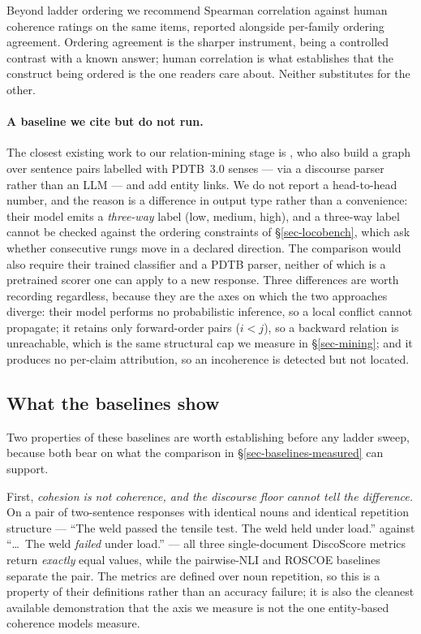 Beyond ladder ordering we recommend Spearman correlation against human coherence ratings on the same
items, reported alongside per-family ordering agreement. Ordering agreement is the sharper instrument,
being a controlled contrast with a known answer; human correlation is what establishes that the
construct being ordered is the one readers care about. Neither substitutes for the other.

\paragraph{A baseline we cite but do not run.} The closest existing work to our relation-mining stage
is \citet{liustrube}, who also build a graph over sentence pairs labelled with PDTB~3.0 senses --- via
a discourse parser rather than an LLM --- and add entity links. We do not report a head-to-head number,
and the reason is a difference in output type rather than a convenience: their model emits a
\emph{three-way} label (low, medium, high), and a three-way label cannot be checked against the
ordering constraints of \S\ref{sec-locobench}, which ask whether consecutive rungs move in a declared
direction. The comparison would also require their trained classifier and a PDTB parser, neither of
which is a pretrained scorer one can apply to a new response. Three differences are worth recording
regardless, because they are the axes on which the two approaches diverge: their model performs no
probabilistic inference, so a local conflict cannot propagate; it retains only forward-order pairs
($i<j$), so a backward relation is unreachable, which is the same structural cap we measure in
\S\ref{sec-mining}; and it produces no per-claim attribution, so an incoherence is detected but not
located.

\subsection{What the baselines show}
\label{sec-baseline-results}

Two properties of these baselines are worth establishing before any ladder sweep, because both bear
on what the comparison in \S\ref{sec-baselines-measured} can support.

First, \emph{cohesion is not coherence, and the discourse floor cannot tell the difference.} On a pair
of two-sentence responses with identical nouns and identical repetition structure --- ``The weld passed
the tensile test. The weld held under load.'' against ``\dots\ The weld \emph{failed} under load.'' ---
all three single-document DiscoScore metrics return \emph{exactly} equal values, while the pairwise-NLI
and ROSCOE baselines separate the pair. The metrics are defined over noun repetition, so this is a
property of their definitions rather than an accuracy failure; it is also the cleanest available
demonstration that the axis we measure is not the one entity-based coherence models measure.

